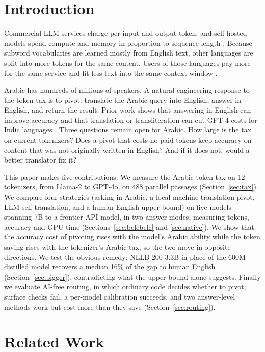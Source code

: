 \documentclass[conference,a4paper]{IEEEtran}
\begin{document}
\section{Introduction}

Commercial LLM services charge per input and output token, and self-hosted
models spend compute and memory in proportion to sequence length \cite{pope}.
Because subword vocabularies \cite{sennrich} are learned mostly from
English text, other languages are split into more tokens for the same content.
Users of those languages pay more for the same service and fit less text into
the same context window \cite{petrov, ahia, solatorio, lundin}.

Arabic has hundreds of millions of speakers. A natural engineering response to
the token tax is to pivot: translate the Arabic query into English, answer in
English, and return the result. Prior work shows that answering in English can
improve accuracy \cite{etxaniz, huang} and that translation or transliteration
can cut GPT-4 costs for Indic languages \cite{nag}. Three questions remain open
for Arabic. How large is the tax on current tokenizers? Does a pivot that costs
no paid tokens keep accuracy on content that was not originally written in
English? And if it does not, would a better translator fix it?

This paper makes five contributions. We measure the Arabic token tax on 12
tokenizers, from Llama-2 to GPT-4o, on 488 parallel passages
(Section~\ref{sec:tax}). We compare four strategies (asking in Arabic, a local
machine-translation pivot, LLM self-translation, and a human-English upper
bound) on five models spanning 7B to a frontier API model, in two answer modes,
measuring tokens, accuracy and GPU time (Sections~\ref{sec:belebele} and
\ref{sec:native}). We show that the accuracy cost of pivoting rises with the
model's Arabic ability while the token saving rises with the tokenizer's Arabic
tax, so the two move in opposite directions. We test the obvious remedy: NLLB-200
3.3B in place of the 600M distilled model recovers a median 16\% of the gap to
human English (Section~\ref{sec:bigger}), contradicting what the upper bound
alone suggests. Finally we evaluate AI-free routing, in which ordinary code
decides whether to pivot; surface checks fail, a per-model calibration
succeeds, and two answer-level methods work but cost more than they save
(Section~\ref{sec:routing}).

\section{Related Work}
\end{document}
